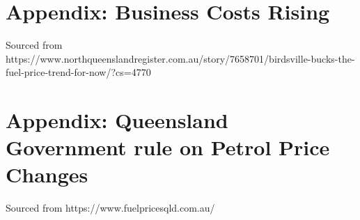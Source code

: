 \documentclass[10pt]{article} %
\begin{document}
\section{Appendix: Business Costs Rising}
\label{appendix:TruckingIndustry}
Sourced from https://www.northqueenslandregister.com.au/story/7658701/birdsville-bucks-the-fuel-price-trend-for-now/?cs=4770

\section{Appendix: Queensland Government rule on Petrol Price Changes}
\label{appendix:QldGovPetrolPriceChangeRule}
Sourced from https://www.fuelpricesqld.com.au/
\end{document}
